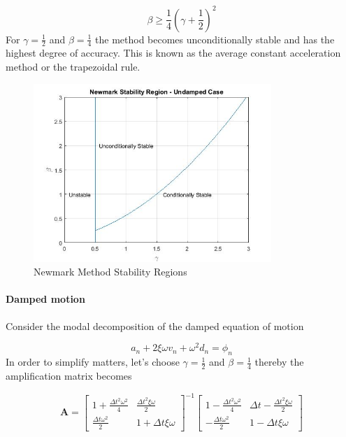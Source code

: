\documentclass{article}
\begin{document}
				\begin{equation}
					\beta \geq \frac{1}{4}\left(\gamma + \frac{1}{2}\right)^2
				\end{equation}
For $\gamma = \frac{1}{2}$ and $\beta = \frac{1}{4}$ the method becomes unconditionally stable and has the highest degree of accuracy. This is known as the average constant acceleration method or the trapezoidal rule.

				\begin{figure}[h!]
   					 \centering
   					 \includegraphics[width=90mm]{GraphNM.jpg}
   					 \caption{Newmark Method Stability Regions}
				            \label{fig6}
  				\end{figure}

			\paragraph{Damped motion} Consider the modal decomposition of the damped equation of motion

				\begin{equation*}
					a_n + 2\xi\omega v_n + \omega^2 d_n = \phi_n
				\end{equation*}
In order to simplify matters, let's choose $\gamma = \frac{1}{2}$ and $\beta = \frac{1}{4}$ thereby the amplification matrix becomes

				\begin{equation*}
					\textbf{A} = \begin{bmatrix} 1+ \frac{\Delta t^2 \omega^2}{4} & \frac{\Delta t^2 \xi \omega}{2} \\
\frac{\Delta t \omega^2}{2}& 1 + \Delta t \xi \omega\end{bmatrix}^{-1}\begin{bmatrix} 1 -\frac{\Delta t^2 \omega^2}{4} & \Delta t -  \frac{\Delta t^2 \xi \omega}{2} \\ -\frac{\Delta t \omega^2}{2} & 1 - \Delta t \xi \omega \end{bmatrix}
				\end{equation*}
\end{document}
